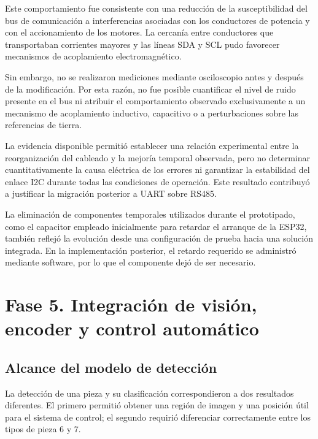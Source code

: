 Este comportamiento fue consistente con una reducción de la susceptibilidad del bus de comunicación a interferencias asociadas con los conductores de potencia y con el accionamiento de los motores. La cercanía entre conductores que transportaban corrientes mayores y las líneas SDA y SCL pudo favorecer mecanismos de acoplamiento electromagnético.

Sin embargo, no se realizaron mediciones mediante osciloscopio antes y después de la modificación. Por esta razón, no fue posible cuantificar el nivel de ruido presente en el bus ni atribuir el comportamiento observado exclusivamente a un mecanismo de acoplamiento inductivo, capacitivo o a perturbaciones sobre las referencias de tierra.

La evidencia disponible permitió establecer una relación experimental entre la reorganización del cableado y la mejoría temporal observada, pero no determinar cuantitativamente la causa eléctrica de los errores ni garantizar la estabilidad del enlace I2C durante todas las condiciones de operación. Este resultado contribuyó a justificar la migración posterior a UART sobre RS485.

La eliminación de componentes temporales utilizados durante el prototipado, como el capacitor empleado inicialmente para retardar el arranque de la ESP32, también reflejó la evolución desde una configuración de prueba hacia una solución integrada. En la implementación posterior, el retardo requerido se administró mediante software, por lo que el componente dejó de ser necesario.



\section{Fase 5. Integración de visión, encoder y control automático}
\label{sec:discusion_fase5}


\subsection{Alcance del modelo de detección}

La detección de una pieza y su clasificación correspondieron a dos resultados diferentes. El primero permitió obtener una región de imagen y una posición útil para el sistema de control; el segundo requirió diferenciar correctamente entre los tipos de pieza 6 y 7.

